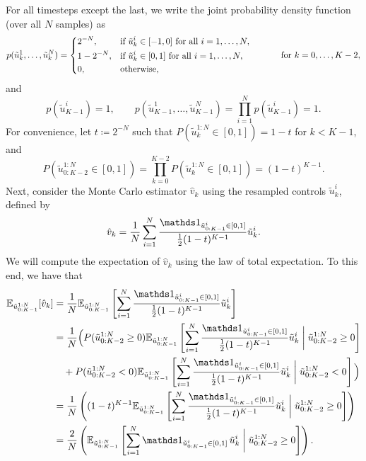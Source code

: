 For all timesteps except the last, we write the joint probability density function (over all $N$ samples) as
\begin{equation}
    p(\tilde{u}^1_k, \dots, \tilde{u}^N_k) = \begin{dcases}
        2^{-N}, & \text{if } \tilde{u}^i_k \in [-1, 0] \text{ for all } i = 1, \dots, N, \\
        1 - 2^{-N}, & \text{if } \tilde{u}^i_k \in [0, 1] \text{ for all } i = 1, \dots, N, \\
        0, & \text{otherwise,}
    \end{dcases}
    \qquad
    \quad
    \text{ for }
    k = 0, \dots, K - 2,
\end{equation}
and
\begin{equation}
    p(\tilde{u}^i_{K-1}) = 1,
    \qquad
    p(\tilde{u}^1_{K-1}, \dots, \tilde{u}^N_{K-1}) = \prod_{i=1}^N p(\tilde{u}^i_{K-1}) = 1.
\end{equation}
For convenience, let $t \coloneqq 2^{-N}$ such that $P(\tilde{u}^{1:N}_k \in [0, 1]) = 1 - t$ for $k < K-1$,
and
\begin{equation}
    P(\tilde{u}^{1:N}_{0:K-2} \in [0, 1]) = \prod_{k=0}^{K-2} P(\tilde{u}^{1:N}_k \in [0, 1]) = (1 - t)^{K-1}.
\end{equation}
Next, consider the Monte Carlo estimator $\hat{v}_k$ using the resampled controls $\tilde{u}^i_k$, defined by
\begin{equation}
    \hat{v}_k = \frac{1}{N} \sum_{i=1}^N \frac{ \ind{\tilde{u}^i_{0:K-1} \in [0, 1]} }{ \frac{1}{2} (1 - t)^{K-1} } \tilde{u}^i_k.
\end{equation}
We will compute the expectation of $\hat{v}_k$ using the law of total expectation. To this end, we have that
\begin{align}
    \E_{\tilde{u}_{0:K-1}^{1:N}}[ \hat{v}_k ]
    &= \frac{1}{N} \E_{\tilde{u}_{0:K-1}^{1:N}}\left[ \sum_{i=1}^N \frac{ \ind{\tilde{u}^i_{0:K-1} \in [0, 1]} }{ \frac{1}{2} (1 - t)^{K-1} } \tilde{u}^i_k \right] \\
    &= \frac{1}{N}\Big( P(\tilde{u}_{0:K-2}^{1:N} \geq 0) \E_{\tilde{u}_{0:K-1}^{1:N}}\left[ \sum_{i=1}^N \frac{ \ind{\tilde{u}^i_{0:K-1} \in [0, 1]} }{ \frac{1}{2} (1 - t)^{K-1} } \tilde{u}^i_k \mathrel{\bigg|} \tilde{u}_{0:K-2}^{1:N} \geq 0\right] \\
    &\quad + P(\tilde{u}_{0:K-2}^{1:N} < 0) \E_{\tilde{u}_{0:K-1}^{1:N}}\left[ \sum_{i=1}^N \frac{ \ind{\tilde{u}^i_{0:K-1} \in [0, 1]} }{ \frac{1}{2} (1 - t)^{K-1} } \tilde{u}^i_k \mathrel{\bigg|} \tilde{u}_{0:K-2}^{1:N} < 0\right]
    \Big) \notag \\
    &= \frac{1}{N}\left( (1 - t)^{K-1} \E_{\tilde{u}_{0:K-1}^{1:N}}\left[ \sum_{i=1}^N \frac{ \ind{\tilde{u}^i_{0:K-1} \in [0, 1]} }{ \frac{1}{2} (1 - t)^{K-1} } \tilde{u}^i_k \mathrel{\bigg|} \tilde{u}_{0:K-2}^{1:N} \geq 0\right]
    \right) \\
    &= \frac{2}{N}\left( \E_{\tilde{u}_{0:K-1}^{1:N}}\left[ \sum_{i=1}^N \ind{\tilde{u}^i_{0:K-1} \in [0, 1]}\, \tilde{u}^i_k \mathrel{\bigg|} \tilde{u}_{0:K-2}^{1:N} \geq 0\right]
    \right).
\end{align}
